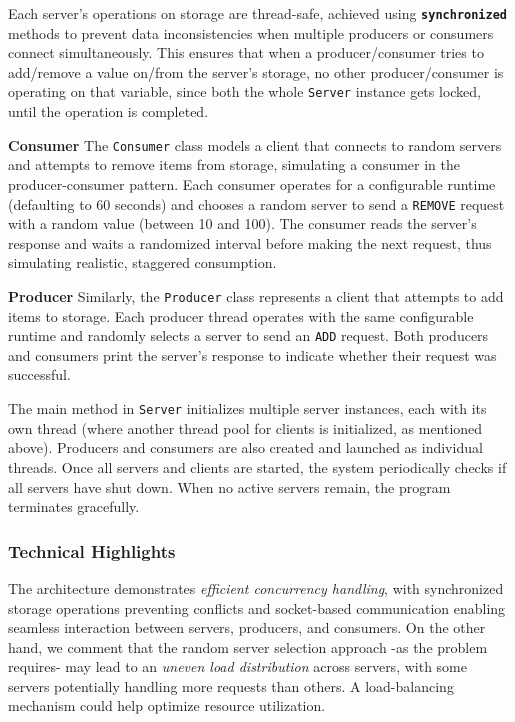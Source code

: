 \documentclass[acmlarge]{acmart}
\begin{document}
Each server’s operations on storage are thread-safe, achieved using \textbf{\texttt{synchronized}} methods to prevent data
inconsistencies when multiple producers or consumers connect simultaneously.
This ensures that when a producer/consumer tries to add/remove a value on/from the server's storage, no other
producer/consumer is operating on that variable, since both the whole \texttt{Server} instance gets locked, until the
operation is completed.

\textbf{Consumer}
The \texttt{Consumer} class models a client that connects to random servers and attempts to remove items from storage, simulating a consumer in the producer-consumer pattern.
Each consumer operates for a configurable runtime (defaulting to 60 seconds) and chooses a random server to send a \texttt{REMOVE} request with a random value (between 10 and 100).
The consumer reads the server’s response and waits a randomized interval before making the next request, thus simulating realistic, staggered consumption.

\textbf{Producer}
Similarly, the \texttt{Producer} class represents a client that attempts to add items to storage.
Each producer thread operates with the same configurable runtime and randomly selects a server to send an \texttt{ADD} request.
Both producers and consumers print the server's response to indicate whether their request was successful.

The main method in \texttt{Server} initializes multiple server instances, each with its own thread (where another
thread pool for clients is initialized, as mentioned above).
Producers and consumers are also created and launched as individual threads.
Once all servers and clients are started, the system periodically checks if all servers have shut down.
When no active servers remain, the program terminates gracefully.

\subsubsection{Technical Highlights}
The architecture demonstrates \textit{efficient concurrency handling}, with synchronized storage operations preventing
conflicts and socket-based communication enabling seamless interaction between servers, producers, and consumers.
On the other hand, we comment that the random server selection approach -as the problem requires- may lead to an
\textit{uneven load distribution} across servers, with some servers potentially handling more requests than others.
A load-balancing mechanism could help optimize resource utilization.
\end{document}
